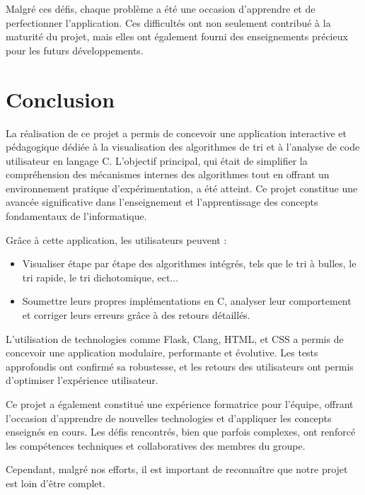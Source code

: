 \documentclass[a4paper, 12pt, twoside]{article}
\begin{document}
Malgré ces défis, chaque problème a été une occasion d’apprendre et de perfectionner l’application. Ces difficultés ont non seulement contribué à la maturité du projet, mais elles ont également fourni des enseignements précieux pour les futurs développements.
\newpage
\section{Conclusion}
\vspace{40pt}
La réalisation de ce projet a permis de concevoir une application interactive et pédagogique dédiée à la visualisation des algorithmes de tri et à l’analyse de code utilisateur en langage C. L’objectif principal, qui était de simplifier la compréhension des mécanismes internes des algorithmes tout en offrant un environnement pratique d’expérimentation, a été atteint. Ce projet constitue une avancée significative dans l’enseignement et l’apprentissage des concepts fondamentaux de l’informatique.

Grâce à cette application, les utilisateurs peuvent :
\begin{itemize}
    \item Visualiser étape par étape des algorithmes intégrés, tels que le tri à bulles, le tri rapide, le tri dichotomique, ect...
    \item Soumettre leurs propres implémentations en C, analyser leur comportement et corriger leurs erreurs grâce à des retours détaillés.
\end{itemize}
L’utilisation de technologies comme Flask, Clang, HTML, et CSS a permis de concevoir une application modulaire, performante et évolutive. Les tests approfondis ont confirmé sa robustesse, et les retours des utilisateurs ont permis d’optimiser l’expérience utilisateur.
\newline

Ce projet a également constitué une expérience formatrice pour l’équipe, offrant l’occasion d’apprendre de nouvelles technologies et d’appliquer les concepts enseignés en cours. Les défis rencontrés, bien que parfois complexes, ont renforcé les compétences techniques et collaboratives des membres du groupe.
\newline

Cependant, malgré nos efforts, il est important de reconnaître que notre projet est loin d'être complet.

\newpage
\end{document}
